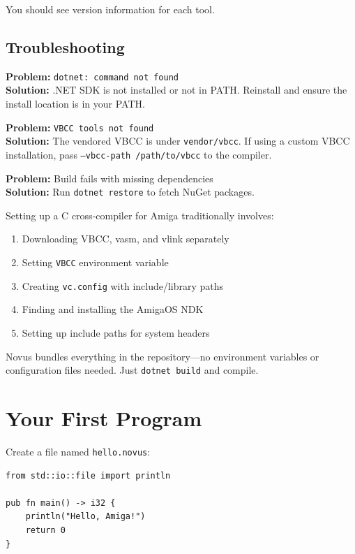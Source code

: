 You should see version information for each tool.

\subsection{Troubleshooting}

\textbf{Problem:} \texttt{dotnet: command not found}\\
\textbf{Solution:} .NET SDK is not installed or not in PATH. Reinstall and ensure the install location is in your PATH.

\textbf{Problem:} \texttt{VBCC tools not found}\\
\textbf{Solution:} The vendored VBCC is under \texttt{vendor/vbcc}. If using a custom VBCC installation, pass \texttt{--vbcc-path /path/to/vbcc} to the compiler.

\textbf{Problem:} Build fails with missing dependencies\\
\textbf{Solution:} Run \texttt{dotnet restore} to fetch NuGet packages.

\begin{comingfromc}
Setting up a C cross-compiler for Amiga traditionally involves:
\begin{enumerate}
\item Downloading VBCC, vasm, and vlink separately
\item Setting \texttt{VBCC} environment variable
\item Creating \texttt{vc.config} with include/library paths
\item Finding and installing the AmigaOS NDK
\item Setting up include paths for system headers
\end{enumerate}

Novus bundles everything in the repository---no environment variables or configuration files needed. Just \texttt{dotnet build} and compile.
\end{comingfromc}

\section{Your First Program}
\label{sec:first-program}

Create a file named \texttt{hello.novus}:

\begin{lstlisting}
from std::io::file import println

pub fn main() -> i32 {
    println("Hello, Amiga!")
    return 0
}
\end{lstlisting}

